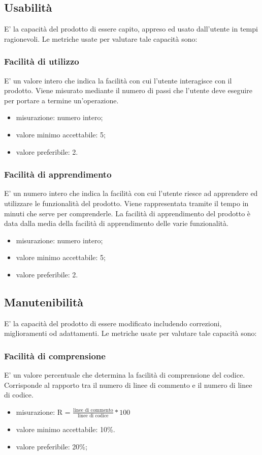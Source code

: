 \subsection{Usabilità}
E' la capacità del prodotto di essere capito, appreso ed usato dall'utente in tempi ragionevoli.
Le metriche usate per valutare tale capacità sono:

	\subsubsection*{Facilità di utilizzo}
	E' un valore intero che indica la facilità con cui l'utente interagisce con il prodotto. Viene misurato mediante il numero di passi che l'utente deve eseguire per portare a termine un'operazione.
	\begin{itemize}
		\item {misurazione: numero intero;}
		\item {valore minimo accettabile: 5;}
		\item {valore preferibile: 2.}
		\end{itemize}
		
	\subsubsection*{Facilità di apprendimento}
	E' un numero intero che indica la facilità con cui l'utente riesce ad apprendere ed utilizzare le funzionalità del prodotto. Viene rappresentata tramite il tempo in minuti che serve per comprenderle. La facilità di apprendimento del prodotto è data dalla media della facilità di apprendimento delle varie funzionalità.
	\begin{itemize}
		\item {misurazione: numero intero;}
		\item {valore minimo accettabile: 5;}
		\item {valore preferibile: 2.}
	\end{itemize}
	
\subsection{Manutenibilità}
E' la capacità del prodotto di essere modificato includendo correzioni, miglioramenti od adattamenti. 
Le metriche usate per valutare tale capacità sono:

	\subsubsection*{Facilità di comprensione}
	E' un valore percentuale che determina la facilità di comprensione del codice. Corrisponde al rapporto tra il numero di linee di commento e il numero di linee di codice.
	\begin{itemize}
		\item{misurazione: R = $\displaystyle\frac{\mbox{linee di commento}}{\mbox{linee di codice}}*100$}
		\item {valore minimo accettabile: 10\%.}
		\item {valore preferibile: 20\%;}
	\end{itemize}
	
